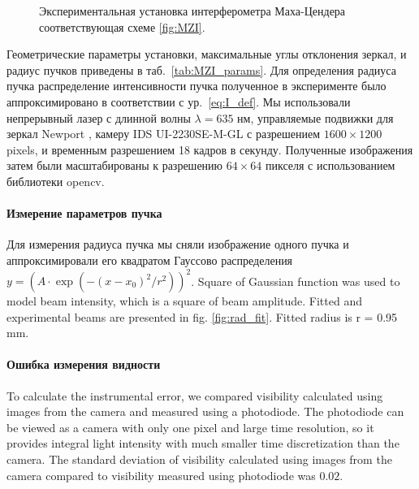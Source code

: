 \begin{figure}[ht]
\caption{Экспериментальная установка интерферометра Маха-Цендера соответствующая схеме \ref{fig:MZI}.}
\label{fig:MZI_exp}
\end{figure}

Геометрические параметры установки, максимальные углы отклонения зеркал, и радиус пучков приведены в таб.~\ref{tab:MZI_params}. Для определения радиуса пучка распределение интенсивности пучка полученное в эксперименте было аппроксимировано в соответствии с ур.~\eqref{eq:I_def}. Мы использовали непрерывный лазер с длинной волны $\lambda =  635$ нм, управляемые подвижки для зеркал Newport \cite{newport_mirror}, 
камеру IDS UI-2230SE-M-GL с разрешением $1600\times1200$ pixels, и временным разрешением 18 кадров в секунду. Полученные изображения затем были масштабированы к разрешению $64\times64$ пикселя с использованием библиотеки opencv.

\paragraph{Измерение параметров пучка}
Для измерения радиуса пучка мы сняли изображение одного пучка и аппроксимировали его квадратом Гауссово распределения $y = \left( A \cdot \exp(-(x - x_0)^2 / r^2) \right) ^2$. Square of Gaussian function was used to model beam intensity, which is a square of beam amplitude. Fitted and experimental beams are presented in fig. \ref{fig:rad_fit}. Fitted radius is r = 0.95 mm. 

\paragraph{Ошибка измерения видности}
To calculate the instrumental error, we compared visibility calculated using images from the camera and measured using a photodiode. The photodiode can be viewed as a camera with only one pixel and large time resolution, so it provides integral light intensity with much smaller time discretization than the camera. The standard deviation of visibility calculated using images from the camera compared to visibility measured using photodiode was $0.02$.


